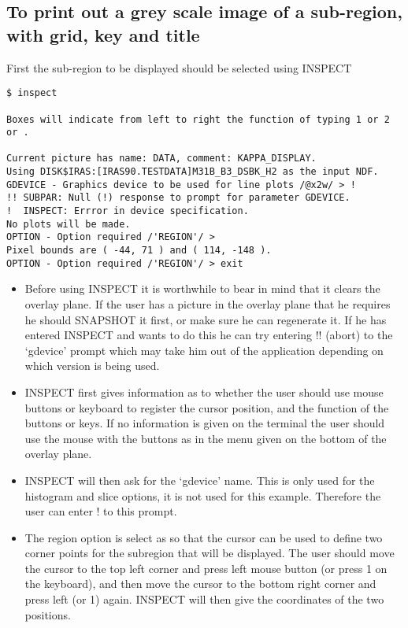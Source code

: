 \subsection{To print out a grey scale image of a sub-region, with grid, key 
and title}
\label{k:greysub}
First the sub-region to be displayed should be selected using INSPECT
\begin{small}
\begin{verbatim}
$ inspect

Boxes will indicate from left to right the function of typing 1 or 2 or .

Current picture has name: DATA, comment: KAPPA_DISPLAY.
Using DISK$IRAS:[IRAS90.TESTDATA]M31B_B3_DSBK_H2 as the input NDF.
GDEVICE - Graphics device to be used for line plots /@x2w/ > !
!! SUBPAR: Null (!) response to prompt for parameter GDEVICE.
!  INSPECT: Errror in device specification.
No plots will be made.
OPTION - Option required /'REGION'/ > 
Pixel bounds are ( -44, 71 ) and ( 114, -148 ).
OPTION - Option required /'REGION'/ > exit
\end{verbatim}
\end{small}
\begin{itemize}
\item Before using INSPECT it is worthwhile to bear in mind that it clears the
overlay plane. If the user has a picture in the overlay plane that he requires
he should SNAPSHOT it first, or make sure he can regenerate it.
If he has entered INSPECT and wants to do this he can try entering !! (abort) 
to the `gdevice' prompt which may take him out of the application depending on
which version is being used.
\item INSPECT first gives information as to whether the user should use mouse
buttons or keyboard to register the cursor position, and the function of the
buttons or keys. If no information is given on the terminal the user should use
the mouse with the buttons as in the menu given on the bottom of the overlay
plane.
\item INSPECT will then ask for the `gdevice' name. This is only used for the
histogram and slice options, it is not used for this example. Therefore the user
can enter ! to this prompt.
\item The region option is select as so that the cursor can be used to define
two corner points for the subregion that will be displayed. The user should
move the cursor to the top left corner and press left mouse button (or press 1
on the keyboard), and then move the cursor to the bottom right corner and press
left (or 1) again. INSPECT will then give the coordinates of the two positions.
\end{itemize}
